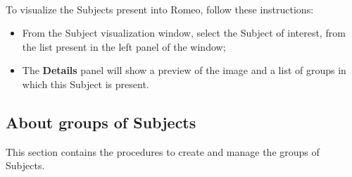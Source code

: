 \pagebreak
\\To visualize the Subjects\g{} present into Romeo, follow these instructions:
\begin{itemize}
\item From the Subject\g{} visualization window, select the Subject\g{} of interest, from the list present in the left panel of the window;
\item The \textbf{Details} panel will show a preview of the image and a list of groups in which this Subject\g{} is present.
\end{itemize}

\subsection{About groups of Subjects}
\label{aboutgroups}
This section contains the procedures to create and manage the groups of Subjects\g{}.

